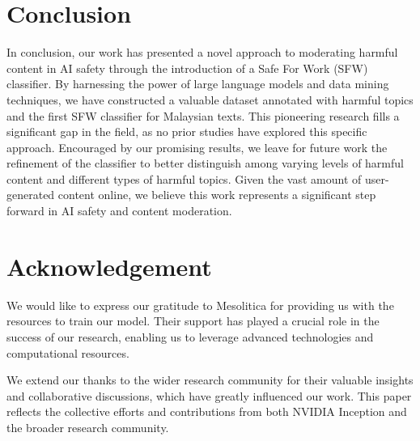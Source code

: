 \documentclass[preprint]{article}
\begin{document}
\section{Conclusion}

In conclusion, our work has presented a novel approach to moderating harmful content in AI safety through the introduction of a Safe For Work (SFW) classifier. By harnessing the power of large language models and data mining techniques, we have constructed a valuable dataset annotated with harmful topics and the first SFW classifier for Malaysian texts. This pioneering research fills a significant gap in the field, as no prior studies have explored this specific approach. Encouraged by our promising results, we leave for future work the refinement of the classifier to better distinguish among varying levels of harmful content and different types of harmful topics. Given the vast amount of user-generated content online, we believe this work represents a significant step forward in AI safety and content moderation.

\section{Acknowledgement}

We would like to express our gratitude to Mesolitica for providing us with the resources to train our model. Their support has played a crucial role in the success of our research, enabling us to leverage advanced technologies and computational resources.

We extend our thanks to the wider research community for their valuable insights and collaborative discussions, which have greatly influenced our work. This paper reflects the collective efforts and contributions from both NVIDIA Inception and the broader research community.

{}

\end{document}
